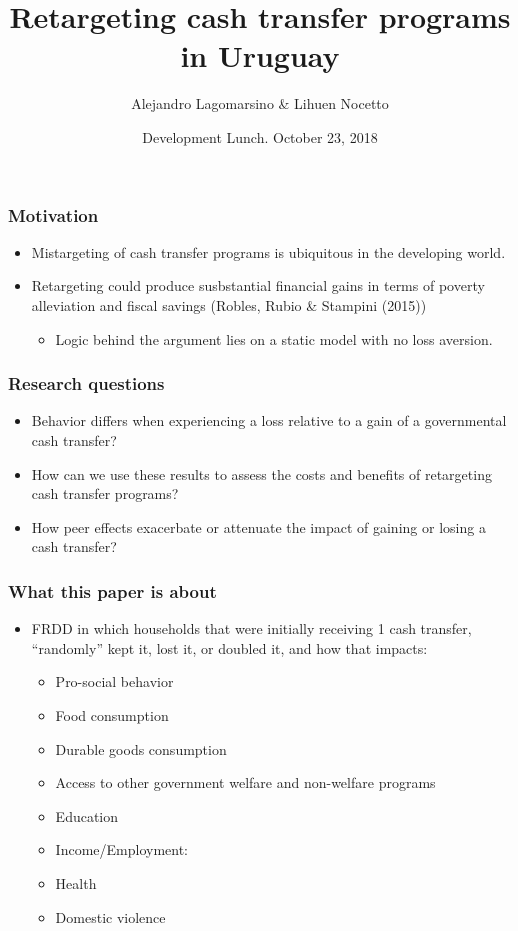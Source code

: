 \documentclass{beamer}
\title[Retargeting cash transfer programs] %
{Retargeting cash transfer programs in Uruguay}
\author[Alejandro Lagomarsino] %
{Alejandro Lagomarsino \& Lihuen Nocetto\inst{*} }
\institute[Harvard University] %
{
	\inst{*}%
	Harvard University\\
	Pontifical Catholic University of Chile
}
\date[October. 2018] %
{Development Lunch. October 23, 2018}
\begin{document}
	\setlength{\parindent}{10pt}
	
	\frame{\titlepage}

\begin{frame}
\frametitle{Motivation}
\begin{itemize}
	\item Mistargeting of cash transfer programs is ubiquitous in the developing world.
	\item Retargeting could produce susbstantial financial gains in terms of poverty alleviation and fiscal savings (Robles, Rubio \& Stampini (2015))
	\begin{itemize}
		\item Logic behind the argument lies on a static model with no loss aversion.
	\end{itemize}
\end{itemize}
\end{frame}

\begin{frame}
\frametitle{Research questions}
\begin{itemize}
	\item Behavior differs when experiencing a loss relative to a gain of a governmental cash transfer?
	\item How can we use these results to assess the costs and benefits of retargeting cash transfer programs?
	\item How peer effects exacerbate or attenuate the impact of gaining or losing a cash transfer?
\end{itemize}
\end{frame}

\begin{frame}
\frametitle{What this paper is about}
\begin{itemize}
	\item FRDD in which households that were initially receiving 1 cash transfer, ``randomly'' kept it, lost it, or doubled it, and how that impacts:
	\begin{itemize}
	\item Pro-social behavior
	\item Food consumption
	\item Durable goods consumption
	\item Access to other government welfare and non-welfare programs 
	\item Education
	\item Income/Employment:
	\item Health
	\item Domestic violence
	\end{itemize}
\end{itemize}
\end{frame}
\end{document}
